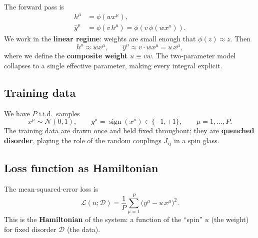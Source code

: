 \documentclass[nobib,justified]{tufte-handout}
\newcommand{\cD}{\mathcal{D}}
\newcommand{\cL}{\mathcal{L}}
\newcommand{\sign}{\operatorname{sign}}
\begin{document}
The forward pass is
\begin{align}
  h^\mu      &= \phi(wx^\mu),                   \label{eq:h}   \\
  \hat{y}^\mu &= \phi\!\left(v\,h^\mu\right)
               = \phi\!\left(v\,\phi(wx^\mu)\right). \label{eq:yhat}
\end{align}
We work in the \textbf{linear regime}: weights are small enough that
$\phi(z)\approx z$.  Then
\begin{equation}
  h^\mu \approx wx^\mu,
  \qquad
  \hat{y}^\mu \approx v\cdot wx^\mu = u\,x^\mu,
  \label{eq:linear}
\end{equation}
where we define the \textbf{composite weight} $u \equiv vw$.  The
two-parameter model collapses to a single effective parameter, making
every integral explicit.

\subsection*{Training data}

We have $P$ i.i.d.\ samples
\begin{equation}
  x^\mu \sim \mathcal{N}(0,1),
  \qquad
  y^\mu = \sign(x^\mu)\in\{-1,+1\},
  \qquad
  \mu = 1,\ldots,P.
  \label{eq:data}
\end{equation}
The training data are drawn once and held fixed throughout; they are
\textbf{quenched disorder}, playing the role of the random couplings
$J_{ij}$ in a spin glass.

\subsection*{Loss function as Hamiltonian}

The mean-squared-error loss is
\begin{equation}
  \cL(u;\cD) = \frac{1}{P}\sum_{\mu=1}^{P}
    \bigl(y^\mu - u\,x^\mu\bigr)^{2}.
  \label{eq:loss}
\end{equation}
This is the \textbf{Hamiltonian} of the system: a function of the
``spin'' $u$ (the weight) for fixed disorder $\cD$ (the data).
\end{document}
